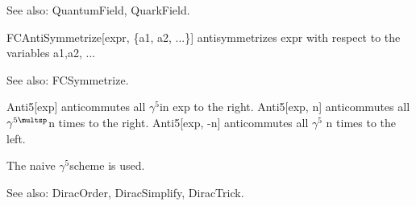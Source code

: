 See also:  QuantumField, QuarkField.



\dispSFoutmath{
\overvar{\psi }{\_}
}



FCAntiSymmetrize[expr, \{a1, a2, ...\}] antisymmetrizes expr with respect to the variables a1,a2, ...

See also: FCSymmetrize.








Anti5[exp] anticommutes all \({{\gamma }^5}\)in exp to the right. Anti5[exp, n] anticommutes all \({{\gamma }^{5\multsp }}\)n times to the right.
Anti5[exp, -n] anticommutes all \({{\gamma }^5}\) n times to the left.

The naive \({{\gamma }^5}\)scheme is used.

See also:  DiracOrder, DiracSimplify, DiracTrick.










